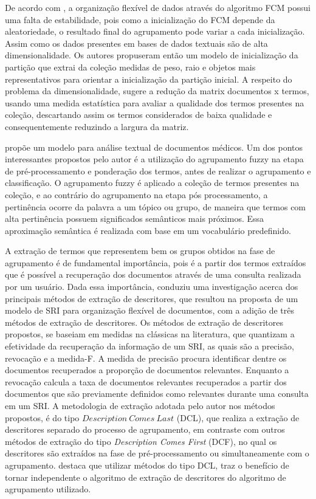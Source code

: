 De acordo com \cite{Deng2010}, a organização flexível de dados através do algoritmo FCM possui
uma falta de estabilidade, pois como a inicialização do FCM depende da aleatoriedade, o resultado
final do agrupamento pode variar a cada inicialização. Assim como os dados presentes em bases de
dados textuais são de alta dimensionalidade.  Os autores propuseram então um modelo de inicialização
da partição que extrai da coleção medidas de peso, raio e objetos mais representativos para orientar
a inicialização da partição inicial. A respeito do problema da dimensionalidade, \cite{Deng2010}
sugere a redução da matrix documentos x termos, usando uma medida estatística para avaliar a
qualidade dos termos presentes na coleção, descartando assim os termos considerados de baixa
qualidade e consequentemente reduzindo a largura da matriz.

\cite{Karami2015} propõe um modelo para análise textual de documentos médicos. Um dos pontos
interessantes propostos pelo autor é a utilização do agrupamento fuzzy na etapa de
pré-processamento e ponderação dos termos, antes de realizar o agrupamento e classificação. 
O agrupamento fuzzy é aplicado a coleção de termos presentes na coleção, e ao contrário do
agrupamento na etapa pós processamento, a pertinência ocorre da palavra a um tópico ou grupo, 
de maneira que termos com alta pertinência possuem significados
semânticos mais próximos. Essa aproximação semântica é realizada com base em um vocabulário
predefinido.

A extração de termos
que representem bem os grupos obtidos na fase de agrupamento é de fundamental importância, pois é
a partir dos termos extraídos que é possível a recuperação dos documentos através de uma consulta 
realizada por um usuário. Dada essa importância, \cite{Nogueira2013} conduziu uma investigação
acerca dos principais métodos de extração de descritores, que resultou na proposta de um
modelo de SRI para organização flexível de documentos, com
a adição de três métodos de extração de descritores. Os métodos de extração de descritores 
propostos, se baseiam em medidas na clássicas na literatura, que quantizam a efetividade da 
recuperação da informação de um SRI, as quais são a precisão, revocação e a medida-F. 
A medida de precisão procura identificar dentre os documentos recuperados a proporção de documentos
relevantes. Enquanto a revocação calcula a taxa de documentos relevantes recuperados a partir dos
documentos que são previamente definidos como relevantes durante uma consulta em um SRI.
A metodologia de extração adotada pelo autor nos métodos propostos, 
é do tipo $Description\ Comes\ Last$ (DCL), que
realiza a extração de descritores separado do processo de agrupamento, em contraste com outros
métodos de extração do tipo \textit{Description Comes First\/} (DCF), no qual os descritores 
são extraídos na
fase de pré-processamento ou simultaneamente com o agrupamento. \cite{Nogueira2013} destaca que
utilizar métodos do tipo DCL, traz o benefício de tornar independente o algoritmo de extração de
descritores do algoritmo de agrupamento utilizado. 

